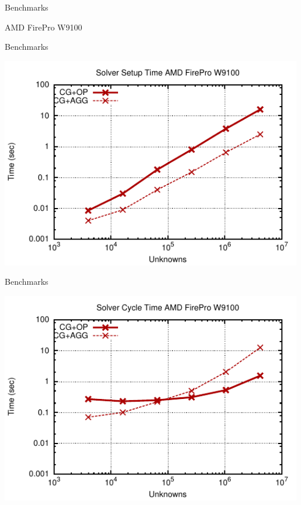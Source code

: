 \begin{frame}{Benchmarks}
  \begin{center}
   AMD FirePro W9100
  \end{center}
\end{frame}
\begin{frame}{Benchmarks}
  \begin{center}
   \includegraphics[width=0.99\textwidth]{figures/w9100-setup.pdf}
  \end{center}
\end{frame}
\begin{frame}{Benchmarks}
  \begin{center}
   \includegraphics[width=0.99\textwidth]{figures/w9100-cycle.pdf}
  \end{center}
\end{frame}
